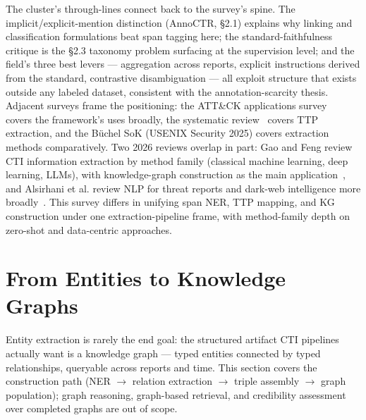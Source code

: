 \documentclass[11pt]{article}
\begin{document}
The cluster's through-lines connect back to the survey's spine. The implicit/explicit-mention distinction (AnnoCTR, §2.1) explains why linking and classification formulations beat span tagging here; the standard-faithfulness critique is the §2.3 taxonomy problem surfacing at the supervision level; and the field's three best levers — aggregation across reports, explicit instructions derived from the standard, contrastive disambiguation — all exploit structure that exists outside any labeled dataset, consistent with the annotation-scarcity thesis. Adjacent surveys frame the positioning: the ATT\&CK applications survey~\citep{jiang2025mitre} covers the framework's uses broadly, the systematic review~\citep{tamanna2026what} covers TTP extraction, and the Büchel SoK (USENIX Security 2025) covers extraction methods comparatively. Two 2026 reviews overlap in part: Gao and Feng review CTI information extraction by method family (classical machine learning, deep learning, LLMs), with knowledge-graph construction as the main application~\citep{gao2026review}, and Alsirhani et al. review NLP for threat reports and dark-web intelligence more broadly~\citep{alsirhani2026nlp}. This survey differs in unifying span NER, TTP mapping, and KG construction under one extraction-pipeline frame, with method-family depth on zero-shot and data-centric approaches.

\section{From Entities to Knowledge Graphs}

Entity extraction is rarely the end goal: the structured artifact CTI pipelines actually want is a knowledge graph — typed entities connected by typed relationships, queryable across reports and time. This section covers the construction path (NER $\rightarrow$ relation extraction $\rightarrow$ triple assembly $\rightarrow$ graph population); graph reasoning, graph-based retrieval, and credibility assessment over completed graphs are out of scope.
\end{document}

